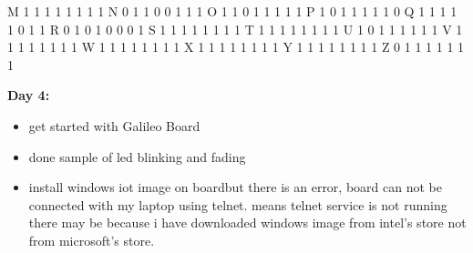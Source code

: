 \documentclass[12pt,a4paper,english]{article}
\begin{document}
\begin{itemize}
			M\hspace{0.72in}		1	1	1	1	1	1	1	1\newline
			N\hspace{0.72in}		0	1	1	0	0	1	1	1\newline
			O\hspace{0.72in}		1	1	0	1	1	1	1	1\newline
			P\hspace{0.72in}		1	0	1	1	1	1	1	0\newline
			Q\hspace{0.72in}		1	1	1	1	1	0	1	1\newline
			R\hspace{0.72in}		0	1	0	1	0	0	0	1\newline
			S\hspace{0.72in}		1	1	1	1	1	1	1	1\newline
			T\hspace{0.72in}		1	1	1	1	1	1	1	1\newline
			U\hspace{0.72in}		1	0	1	1	1	1	1	1\newline
			V\hspace{0.72in}		1	1	1	1	1	1	1	1\newline
			W\hspace{0.66in}		1	1	1	1	1	1	1	1\newline
			X\hspace{0.72in}		1	1	1	1	1	1	1	1\newline
			Y\hspace{0.72in}		1	1	1	1	1	1	1	1\newline
			Z\hspace{0.75in}		0	1	1	1	1	1	1	1\newline
		\end{itemize}
		\begin{flushleft}
			\Huge{ \textbf{Day 4:}}
		\end{flushleft}
		\begin{itemize}
			\item get started with Galileo Board
			\item done sample of led blinking and fading
			\item install windows iot image on board\newline but there is an error, board can not be connected with my laptop using telnet. means telnet service is not running  there may be because i have downloaded windows image from intel's store not from microsoft's store.
		\end{itemize}
\end{document}
